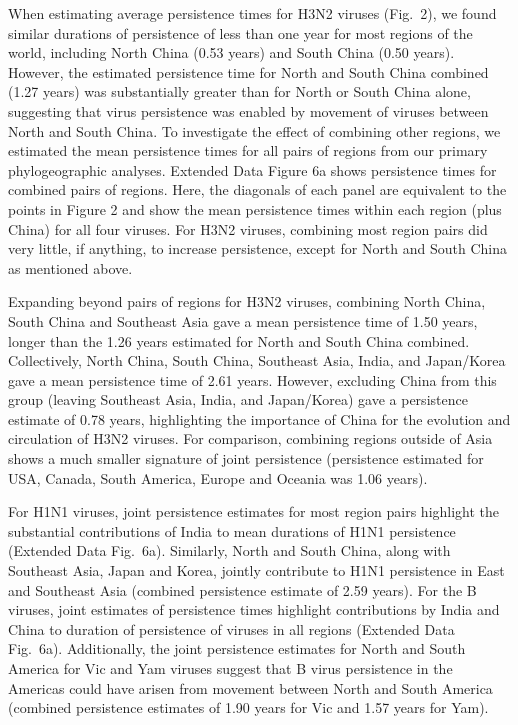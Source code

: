 \documentclass[11pt,oneside,letterpaper]{article}
\begin{document}
When estimating average persistence times for H3N2 viruses (Fig.~2), we found similar durations of persistence of less than one year for most regions of the world, including North China (0.53 years) and South China (0.50 years).
However, the estimated persistence time for North and South China combined (1.27 years) was substantially greater than for North or South China alone, suggesting that virus persistence was enabled by movement of viruses between North and South China.
To investigate the effect of combining other regions, we estimated the mean persistence times for all pairs of regions from our primary phylogeographic analyses.
Extended Data Figure 6a shows persistence times for combined pairs of regions.
Here, the diagonals of each panel are equivalent to the points in Figure 2 and show the mean persistence times within each region (plus China) for all four viruses.
For H3N2 viruses, combining most region pairs did very little, if anything, to increase persistence, except for North and South China as mentioned above.

Expanding beyond pairs of regions for H3N2 viruses, combining North China, South China and Southeast Asia gave a mean persistence time of 1.50 years, longer than the 1.26 years estimated for North and South China combined.
Collectively, North China, South China, Southeast Asia, India, and Japan/Korea gave a mean persistence time of 2.61 years.
However, excluding China from this group (leaving Southeast Asia, India, and Japan/Korea) gave a persistence estimate of 0.78 years, highlighting the importance of China for the evolution and circulation of H3N2 viruses.
For comparison, combining regions outside of Asia shows a much smaller signature of joint persistence (persistence estimated for USA, Canada, South America, Europe and Oceania was 1.06 years).

For H1N1 viruses, joint persistence estimates for most region pairs highlight the substantial contributions of India to mean durations of H1N1 persistence (Extended Data Fig.~6a).
Similarly, North and South China, along with Southeast Asia, Japan and Korea, jointly contribute to H1N1 persistence in East and Southeast Asia (combined persistence estimate of 2.59 years).
For the B viruses, joint estimates of persistence times highlight contributions by India and China to duration of persistence of viruses in all regions (Extended Data Fig.~6a).
Additionally, the joint persistence estimates for North and South America for Vic and Yam viruses suggest that B virus persistence in the Americas could have arisen from movement between North and South America (combined persistence estimates of 1.90 years for Vic and 1.57 years for Yam).
\end{document}
